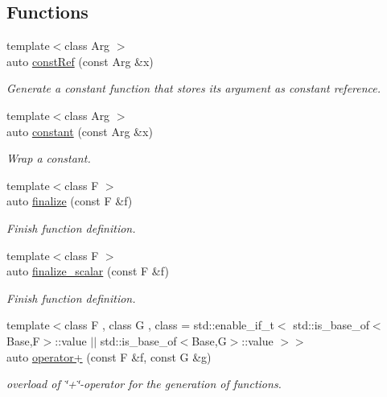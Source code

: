 \subsection*{Functions}
\begin{DoxyCompactItemize}
\item 
{\footnotesize template$<$class Arg $>$ }\\auto \hyperlink{namespaceFunG_abcfb38c2e995436816ea884803302f2d}{const\-Ref} (const Arg \&x)
\begin{DoxyCompactList}\small\item\em Generate a constant function that stores its argument as constant reference. \end{DoxyCompactList}\item 
{\footnotesize template$<$class Arg $>$ }\\auto \hyperlink{namespaceFunG_a65c509062b62b3303268cabc97b75a65}{constant} (const Arg \&x)
\begin{DoxyCompactList}\small\item\em Wrap a constant. \end{DoxyCompactList}\item 
{\footnotesize template$<$class F $>$ }\\auto \hyperlink{namespaceFunG_a3a2af76439713dc7635e0c538ac34f15}{finalize} (const F \&f)
\begin{DoxyCompactList}\small\item\em Finish function definition. \end{DoxyCompactList}\item 
{\footnotesize template$<$class F $>$ }\\auto \hyperlink{namespaceFunG_a0c224cd9b212427657c6798ac8adf6ac}{finalize\-\_\-scalar} (const F \&f)
\begin{DoxyCompactList}\small\item\em Finish function definition. \end{DoxyCompactList}\item 
{\footnotesize template$<$class F , class G , class  = std\-::enable\-\_\-if\-\_\-t$<$ std\-::is\-\_\-base\-\_\-of$<$\-Base,\-F$>$\-::value $\vert$$\vert$                                      std\-::is\-\_\-base\-\_\-of$<$\-Base,\-G$>$\-::value $>$$>$ }\\auto \hyperlink{namespaceFunG_ac7f61d48ff610ec4be8ee6994d165077}{operator+} (const F \&f, const G \&g)
\begin{DoxyCompactList}\small\item\em overload of \char`\"{}+\char`\"{}-\/operator for the generation of functions. \end{DoxyCompactList}\item 

\end{DoxyCompactItemize}
